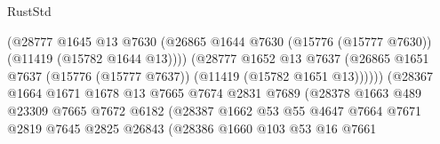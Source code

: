 \begin{lexlean}{RustStd}
\begin{coremodule}
                                          (@28777
                                            @1645
                                            @13
                                            @7630
                                            (@26865
                                              @1644
                                              @7630
                                              (@15776 (@15777 @7630))
                                              (@11419 (@15782 @1644 @13))))
                                          (@28777
                                            @1652
                                            @13
                                            @7637
                                            (@26865
                                              @1651
                                              @7637
                                              (@15776 (@15777 @7637))
                                              (@11419 (@15782 @1651 @13))))))
                                      (@28367
                                        @1664
                                        @1671
                                        @1678
                                        @13
                                        @7665
                                        @7674
                                        @2831
                                        @7689
                                        (@28378
                                          @1663
                                          @489
                                          @23309
                                          @7665
                                          @7672
                                          @6182
                                          (@28387
                                            @1662
                                            @53
                                            @55
                                            @4647
                                            @7664
                                            @7671
                                            @2819
                                            @7645
                                            @2825
                                            @26843
                                            (@28386
                                              @1660
                                              @103
                                              @53
                                              @16
                                              @7661

\end{coremodule}
\end{lexlean}
